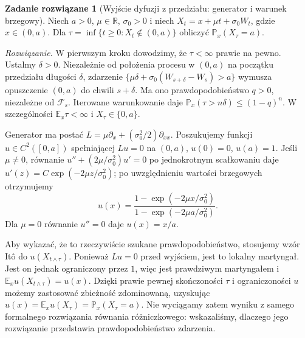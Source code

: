 \documentclass[11pt,a4paper,oneside]{report}
\numberwithin{equation}{chapter}
\theoremstyle{plain}
\theoremstyle{definition}
\newtheorem{zadanie}{Zadanie rozwiązane}[chapter]
\theoremstyle{remark}
\newcommand{\R}{\mathbb{R}}
\newcommand{\Prob}{\mathbb{P}}
\newcommand{\E}{\mathbb{E}}
\newcommand{\calF}{\mathcal{F}}
\begin{document}
\begin{zadanie}[Wyjście dyfuzji z przedziału: generator i warunek brzegowy]
\label{zad:exit-drift}
Niech $a>0$, $\mu\in\R$, $\sigma_0>0$ i niech
$X_t=x+\mu t+\sigma_0W_t$, gdzie $x\in(0,a)$.
Dla $\tau=\inf\{t\ge0:X_t\notin(0,a)\}$ obliczyć
$\Prob_x(X_\tau=a)$.

\emph{Rozwiązanie.} W pierwszym kroku dowodzimy, że
$\tau<\infty$ prawie na pewno. Ustalmy $\delta>0$.
Niezależnie od położenia procesu w $(0,a)$ na początku
przedziału długości $\delta$, zdarzenie
$\{\mu\delta+\sigma_0(W_{s+\delta}-W_s)>a\}$
wymusza opuszczenie $(0,a)$ do chwili $s+\delta$.
Ma ono prawdopodobieństwo $q>0$, niezależne od
$\calF_s$. Iterowane warunkowanie daje
$\Prob_x(\tau>n\delta)\le(1-q)^n$.
W szczególności $\E_x\tau<\infty$ i $X_\tau\in\{0,a\}$.

Generator ma postać $L=\mu\partial_x+
(\sigma_0^2/2)\partial_{xx}$. Poszukujemy funkcji
$u\in C^2([0,a])$ spełniającej
$Lu=0$ na $(0,a)$, $u(0)=0$, $u(a)=1$.
Jeśli $\mu\ne0$, równanie
$u''+(2\mu/\sigma_0^2)u'=0$ po jednokrotnym
scałkowaniu daje
$u'(z)=C\exp(-2\mu z/\sigma_0^2)$;
po uwzględnieniu wartości brzegowych otrzymujemy
\[
u(x)=\frac{1-\exp(-2\mu x/\sigma_0^2)}
{1-\exp(-2\mu a/\sigma_0^2)}.
\]
Dla $\mu=0$ równanie $u''=0$ daje $u(x)=x/a$.

Aby wykazać, że to rzeczywiście szukane prawdopodobieństwo,
stosujemy wzór Itô do $u(X_{t\wedge\tau})$.
Ponieważ $Lu=0$ przed wyjściem, jest to lokalny
martyngał. Jest on jednak ograniczony przez $1$,
więc jest prawdziwym martyngałem i
$\E_xu(X_{t\wedge\tau})=u(x)$.
Dzięki prawie pewnej skończoności $\tau$ i ograniczoności
$u$ możemy zastosować zbieżność zdominowaną, uzyskując
$u(x)=\E_xu(X_\tau)=\Prob_x(X_\tau=a)$.
Nie wyciągamy zatem wyniku z samego formalnego rozwiązania
równania różniczkowego: wskazaliśmy, dlaczego jego
rozwiązanie przedstawia prawdopodobieństwo zdarzenia.
\end{zadanie}
\end{document}

